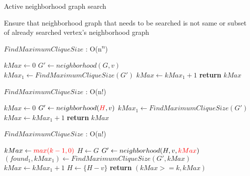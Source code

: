 \documentclass[landscape]{slides}
\begin{document}
\begin{slide}
	\begin{center}
		{\large Active neighborhood graph search }
	\end{center}

	{\large Ensure that neighborhood graph that needs to be searched is not same or subset of already searched vertex's neighborhood graph}
\end{slide}


\begin{algorithm}
	\caption{$FindMaximumCliqueSize$ : O(n\textsuperscript{$n$})}
	\begin{algorithmic}[1]
		\State $kMax \gets 0$
			\State $G' \gets neighborhood(G, v)$
			\State $kMax_1 \gets FindMaximumCliqueSize(G')$
				\State $kMax \gets kMax_1 + 1$
			\EndIf
		\EndFor
		\State \textbf{return} $kMax$
	\EndFunction
	\end{algorithmic}
\end{algorithm}

\begin{algorithm}
	\caption{$FindMaximumCliqueSize$ : O(n!)}
	\begin{algorithmic}[1]
		\State $kMax \gets 0$
			\State $G' \gets neighborhood({\color{red} H}, v)$
			\State $kMax_1 \gets FindMaximumCliqueSize(G')$
				\State $kMax \gets kMax_1 + 1$
			\EndIf
		\EndFor
		\State \textbf{return} $kMax$
		\EndFunction
	\end{algorithmic}
\end{algorithm}

\begin{algorithm}
	\caption{$FindMaximumCliqueSize$ : O(n!)}
	\begin{algorithmic}[1]
		\State $kMax \gets {\color{red}max(k - 1, 0)}$
		\State $H \gets G$
			\State $G' \gets neighborhood(H, v, {\color{red}kMax})$
			{\color{red}
				\State $(found_1, kMax_1) \gets FindMaximumCliqueSize(G', kMax)$
					\State $kMax \gets kMax_1 + 1$
				\EndIf
			\EndIf 
			}
			\State $H \gets \{H - v\}$
		\EndFor
		\State \textbf{return} {\color{red} $(kMax >= k, kMax)$ }
		\EndFunction
	\end{algorithmic}
\end{algorithm}
\end{document}
